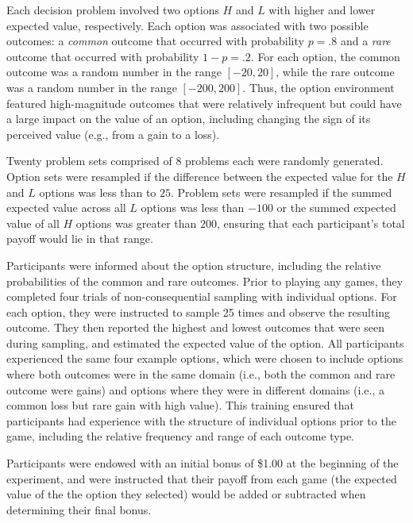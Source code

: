 \documentclass[11pt,jou]{apa6}
\begin{document}
Each decision problem involved two options $H$ and $L$ with higher and lower expected value, respectively.
Each option was associated with two possible outcomes: a \emph{common} outcome that occurred with probability $p = .8$ and a \emph{rare} outcome that occurred with probability $1 - p = .2$.
For each option, the common outcome was a random number in the range $[-20, 20]$, while the rare outcome was a random number in the range $[-200, 200]$.
Thus, the option environment featured high-magnitude outcomes that were relatively infrequent but could have a large impact on the value of an option, including changing the sign of its perceived value (e.g., from a gain to a loss).

Twenty problem sets comprised of 8 problems each were randomly generated.
Option sets were resampled if the difference between the expected value for the $H$ and $L$ options was less than to $25$. 
Problem sets were resampled if the summed expected value across all $L$ options was less than $-100$ or the summed expected value of all $H$ options was greater than $200$, ensuring that each participant's total payoff would lie in that range.

Participants were informed about the option structure, including the relative probabilities of the common and rare outcomes.
Prior to playing any games, they completed four trials of non-consequential sampling with individual options.
For each option, they were instructed to sample 25 times and observe the resulting outcome.
They then reported the highest and lowest outcomes that were seen during sampling, and estimated the expected value of the option.
All participants experienced the same four example options, which were chosen to include options where both outcomes were in the same domain (i.e., both the common and rare outcome were gains) and options where they were in different domains (i.e., a common loss but rare gain with high value).
This training ensured that participants had experience with the structure of individual options prior to the game, including the relative frequency and range of each outcome type. 

Participants were endowed with an initial bonus of \$1.00 at the beginning of the experiment, and were instructed that their payoff from each game (the expected value of the the option they selected) would be added or subtracted when determining their final bonus.
\end{document}
